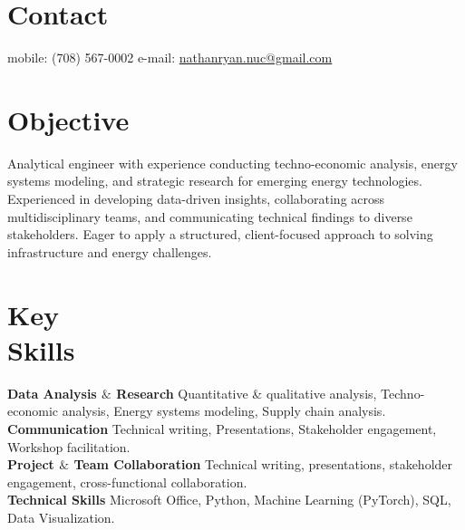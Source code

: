 \documentclass[margin,line]{resume}
\begin{document}
\begin{resume}

%


    \section{\mysidestyle Contact}
    mobile: (708) 567-0002 \hfill e-mail: \href{mailto:nathanryan.nuc@gmail.com}{nathanryan.nuc@gmail.com} \hfill \hfill  \hfill \hspace{0mm}\\\vspace{1mm}%

    \vspace{-6mm}
    \section{\mysidestyle Objective}
        Analytical engineer with experience conducting techno-economic analysis, energy systems modeling, and strategic research for emerging energy technologies. Experienced in developing data-driven insights, collaborating across multidisciplinary teams, and communicating technical findings to diverse stakeholders. Eager to apply a structured, client-focused approach to solving infrastructure and energy challenges.
    \section{\mysidestyle Key\\Skills}
        \textbf{Data Analysis $\&$ Research} Quantitative & qualitative analysis, Techno-economic analysis, Energy systems modeling, Supply chain analysis.\vspace{1mm}\\
        \textbf{Communication} Technical writing, Presentations, Stakeholder engagement, Workshop facilitation.\vspace{1mm}\\
        \textbf{Project $\&$ Team Collaboration} Technical writing, presentations, stakeholder engagement, cross-functional collaboration.\vspace{1mm}\\
        \textbf{Technical Skills} Microsoft Office, Python, Machine Learning (PyTorch), SQL, Data Visualization.\vspace{1mm}


\end{resume}
\end{document}
